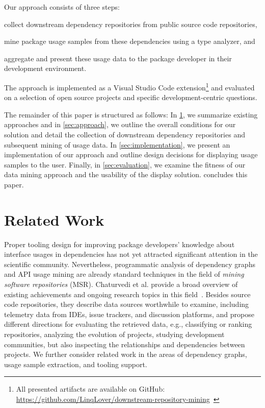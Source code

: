 \documentclass[a4paper,twoside]{article}
\begin{document}
Our approach consists of three steps:
\begin{enumerate*}[label=(\roman*)]
	\item collect downstream dependency repositories from public source code repositories,
	\item mine package usage samples from these dependencies using a type analyzer,
	and \item aggregate and present these usage data to the package developer in their development environment.
\end{enumerate*}
The approach is implemented as a Visual Studio Code extension\footnote{All presented artifacts are available on GitHub: \href{https://github.com/LinqLover/downstream-repository-mining}{https://github.com/LinqLover/downstream-repository-mining}~\cite{thiede2022dowdep}} and evaluated on a selection of open source projects and specific development-centric questions.

The remainder of this paper is structured as follows:
In \cref{sec:related_work}, we summarize existing approaches and in \cref{sec:approach}, we outline the overall conditions for our solution and detail the collection of downstream dependency repositories and subsequent mining of usage data.
In \cref{sec:implementation}, we present an implementation of our approach and outline design decisions for displaying usage samples to the user.
Finally, in \cref{sec:evaluation}, we examine the fitness of our data mining approach and the usability of the display solution.
 concludes this paper.

\section{Related Work}
\label{sec:related_work}
Proper tooling design for improving package developers' knowledge about interface usages in dependencies has not yet attracted significant attention in the scientific community.
Nevertheless, programmatic analysis of dependency graphs and API usage mining are already standard techniques in the field of \emph{mining software repositories} (MSR).
Chaturvedi et al. provide a broad overview of existing achievements and ongoing research topics in this field~\cite{chaturvedi2013tools}.
Besides source code repositories, they describe data sources worthwhile to examine, including telemetry data from IDEs, issue trackers, and discussion platforms, and propose different directions for evaluating the retrieved data, e.g., classifying or ranking repositories, analyzing the evolution of projects, studying development communities, but also inspecting the relationships and dependencies between projects.
We further consider related work in the areas of dependency graphs, usage sample extraction, and tooling support.
\end{document}
